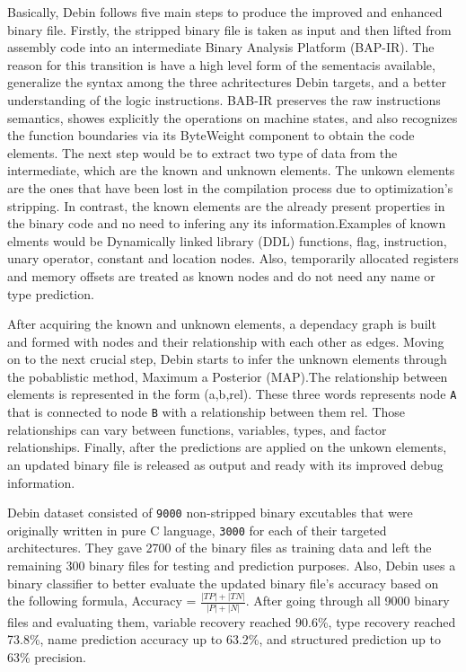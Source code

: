 \documentclass[conference,a4paper]{IEEEtran}
\begin{document}
Basically, Debin follows five main steps to produce the improved and enhanced binary file. Firstly, the stripped binary file is taken as input and then lifted from assembly code into an intermediate Binary Analysis Platform (BAP-IR). The reason for this transition is have a high level form of the sementacis available, generalize the
syntax among the three achritectures Debin targets, and a better understanding of the logic instructions. BAB-IR preserves the raw instructions semantics, showes explicitly the operations on machine states, and also recognizes the function boundaries via its ByteWeight component to obtain the code elements.
The next step would be to extract two type of data from the intermediate, which are the known and unknown elements. The unkown elements are the ones that have been lost in the compilation process due to optimization's stripping. In contrast, the known elements are the already present properties in the binary
code and no need to infering any its information.Examples of known elments would be Dynamically linked library (DDL) functions, flag, instruction, unary operator, constant and location nodes. Also, temporarily allocated registers and memory offsets are treated as known nodes and do not need any name or type prediction.

After acquiring the known and unknown elements, a dependacy graph is built and formed with nodes and their relationship with each other as edges.
Moving on to the next crucial step, Debin starts to infer the unknown elements through the pobablistic method, Maximum a Posterior (MAP).The relationship between elements is represented in the form (a,b,rel). These three words represents node \verb|A| that is connected to node \verb|B| with a relationship between them rel. Those relationships can vary between functions, variables, types, and factor relationships.
Finally, after the predictions are applied on the unkown elements, an updated binary file is released as output and ready with its improved debug information.

Debin dataset consisted of \verb|9000| non-stripped binary excutables that were originally written in pure C language, \verb|3000| for each of their targeted architectures. They gave 2700 of the binary files as training data and left the remaining 300 binary files for testing and prediction purposes.
Also, Debin uses a binary classifier to better evaluate the updated binary file's accuracy based on the following formula, Accuracy = ${\frac{|TP|+|TN|}{|P|+|N|}}$. After going through all 9000 binary files and evaluating them, variable recovery reached 90.6\%, type recovery reached 73.8\%, name prediction accuracy up to 63.2\%, and structured prediction up to 63\% precision.
\end{document}
